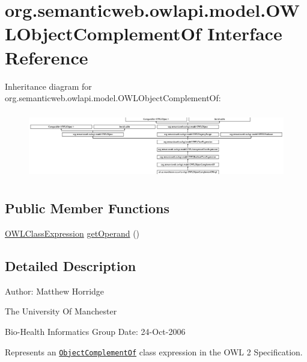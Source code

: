 \hypertarget{interfaceorg_1_1semanticweb_1_1owlapi_1_1model_1_1_o_w_l_object_complement_of}{\section{org.\-semanticweb.\-owlapi.\-model.\-O\-W\-L\-Object\-Complement\-Of Interface Reference}
\label{interfaceorg_1_1semanticweb_1_1owlapi_1_1model_1_1_o_w_l_object_complement_of}
}
Inheritance diagram for org.\-semanticweb.\-owlapi.\-model.\-O\-W\-L\-Object\-Complement\-Of\-:\begin{figure}[H]
\begin{center}
\leavevmode
\includegraphics[height=2.924282cm]{interfaceorg_1_1semanticweb_1_1owlapi_1_1model_1_1_o_w_l_object_complement_of}
\end{center}
\end{figure}
\subsection*{Public Member Functions}
\begin{DoxyCompactItemize}
\item 
\hyperlink{interfaceorg_1_1semanticweb_1_1owlapi_1_1model_1_1_o_w_l_class_expression}{O\-W\-L\-Class\-Expression} \hyperlink{interfaceorg_1_1semanticweb_1_1owlapi_1_1model_1_1_o_w_l_object_complement_of_ab8eaf2a7381f45af7db53ec914c9cece}{get\-Operand} ()
\end{DoxyCompactItemize}


\subsection{Detailed Description}
Author\-: Matthew Horridge\par
 The University Of Manchester\par
 Bio-\/\-Health Informatics Group Date\-: 24-\/\-Oct-\/2006 

Represents an \href{http://www.w3.org/TR/2009/REC-owl2-syntax-20091027/#Complement_of_Class_Expressions}{\tt Object\-Complement\-Of} class expression in the O\-W\-L 2 Specification. 

